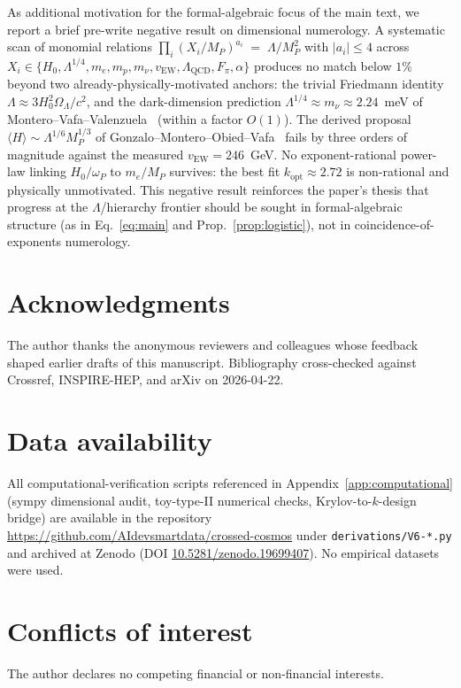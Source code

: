 \documentclass[aps,prd,superscriptaddress,nofootinbib,floatfix,10pt]{revtex4-2}
\theoremstyle{remark}
\begin{document}
As additional motivation for the formal-algebraic focus of the main
text, we report a brief pre-write negative result on dimensional
numerology. A systematic scan of monomial relations
$\prod_{i} (X_{i}/M_{P})^{a_{i}} \;=\; \Lambda/M_{P}^{2}$
with $|a_{i}|\le 4$ across
$X_{i}\in\{H_{0}, \Lambda^{1/4}, m_{e}, m_{p}, m_{\nu}, v_{\mathrm{EW}}, \Lambda_{\mathrm{QCD}}, F_{\pi}, \alpha\}$
produces no match below $1\%$ beyond two already-physically-motivated
anchors: the trivial Friedmann identity
$\Lambda \approx 3 H_{0}^{2}\Omega_{\Lambda}/c^{2}$, and the
dark-dimension prediction
$\Lambda^{1/4}\approx m_{\nu}\approx 2.24$~meV of
Montero--Vafa--Valenzuela~\cite{Montero2022} (within a factor
$O(1)$). The derived
proposal $\langle H\rangle \sim \Lambda^{1/6} M_{P}^{1/3}$ of
Gonzalo--Montero--Obied--Vafa~\cite{GonzaloMonteroObiedVafa2023}
fails by three orders of magnitude against the measured
$v_{\mathrm{EW}} = 246$~GeV. No exponent-rational power-law linking
$H_{0}/\omega_{P}$ to $m_{e}/M_{P}$ survives: the best fit
$k_{\mathrm{opt}} \approx 2.72$ is non-rational and physically
unmotivated. This negative result reinforces the paper's thesis that
progress at the $\Lambda$/hierarchy frontier should be sought in
formal-algebraic structure (as in Eq.~\eqref{eq:main} and
Prop.~\ref{prop:logistic}), not in coincidence-of-exponents
numerology.

\section*{Acknowledgments}
The author thanks the anonymous reviewers and colleagues whose feedback
shaped earlier drafts of this manuscript. Bibliography cross-checked
against Crossref, INSPIRE-HEP, and arXiv on 2026-04-22.

\section*{Data availability}
All computational-verification scripts referenced in
Appendix~\ref{app:computational} (sympy dimensional audit, toy-type-II
numerical checks, Krylov-to-$k$-design bridge) are available in the
repository \url{https://github.com/AIdevsmartdata/crossed-cosmos} under
\texttt{derivations/V6-*.py} and archived at Zenodo
(DOI \href{https://doi.org/10.5281/zenodo.19699407}{10.5281/zenodo.19699407}).
No empirical datasets were used.

\section*{Conflicts of interest}
The author declares no competing financial or non-financial interests.



\end{document}
